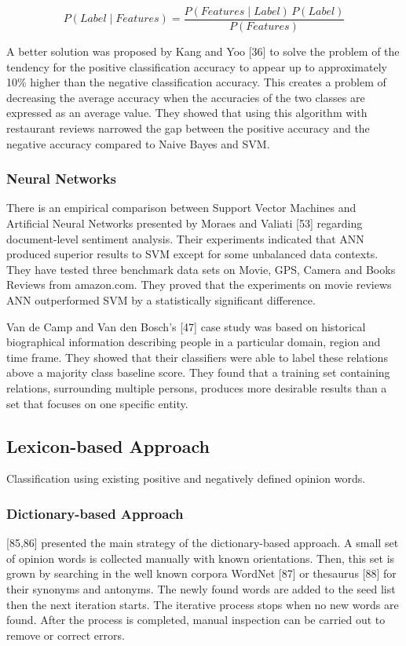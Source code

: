 $$ P(Label \mid Features) = \frac{P(Features \mid Label) \, P(Label)}{P(Features)} $$

 A better solution was proposed by Kang and Yoo [36] to solve the problem of the tendency for the positive classification accuracy to appear up to approximately 10\% higher than the negative classification accuracy. This creates a problem of decreasing the average accuracy when the accuracies of the two classes are expressed as an average value. They showed that using this algorithm with restaurant reviews narrowed the gap between the positive accuracy and the negative accuracy compared to Naive Bayes and SVM.

\subsubsection{Neural Networks}
There is an empirical comparison between Support Vector Machines and Artificial Neural Networks presented by Moraes and Valiati [53] regarding document-level sentiment analysis. Their experiments indicated that ANN produced superior results to SVM except for some unbalanced data contexts. They have tested three benchmark data sets on Movie, GPS, Camera and Books Reviews from amazon.com. They proved that the experiments on movie reviews ANN outperformed SVM by a statistically significant difference.

Van de Camp and Van den Bosch's [47] case study was based on historical biographical information describing people in a particular domain, region and time frame. They showed that their classifiers were able to label these relations above a majority class baseline score. They found that a training set containing relations, surrounding multiple persons, produces more desirable results than a set that focuses on one specific entity. 


\subsection{Lexicon-based Approach}
Classification using existing positive and negatively defined opinion words.

\subsubsection{Dictionary-based Approach}
[85,86] presented the main strategy of the dictionary-based approach. A small set of opinion words is collected manually with known orientations. Then, this set is grown by searching in the well known corpora WordNet [87] or thesaurus [88] for their synonyms and antonyms. The newly found words are added to the seed list then the next iteration starts. The iterative process stops when no new words are found. After the process is completed, manual inspection can be carried out to remove or correct errors.

